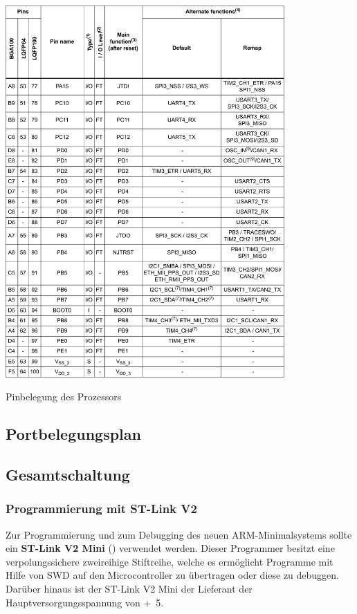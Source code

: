 \begin{table}[htb]\ContinuedFloat
    \centering
    \includegraphics[width=0.8\textwidth]{Schuh/Pictures/Pinbelegung5}
    \caption[Pinbelegung des Prozessors]{Pinbelegung des Prozessors \cite{stm:stm32f107rc}}
\end{table}

\subsection{Portbelegungsplan}
\label{sec:coremodul-portbelegung}

\subsection{Gesamtschaltung}
\label{sec:coremodul-schaltung}

\subsubsection{Programmierung mit ST-Link V2}
\label{sec:coremodul-stlink}
Zur Programmierung und zum \gls{Debugging} des neuen \gls{ARM}-\gls{Minimalsystem}s sollte ein \textbf{ST-Link V2 Mini} () verwendet werden. Dieser Programmer besitzt eine verpolungssichere zweireihige Stiftreihe, welche es ermöglicht Programme mit Hilfe von \gls{SWD} auf den Microcontroller zu übertragen oder diese zu debuggen. Darüber hinaus ist der ST-Link V2 Mini der Lieferant der Hauptversorgungsspannung von \unit{+5}{\volt}.

